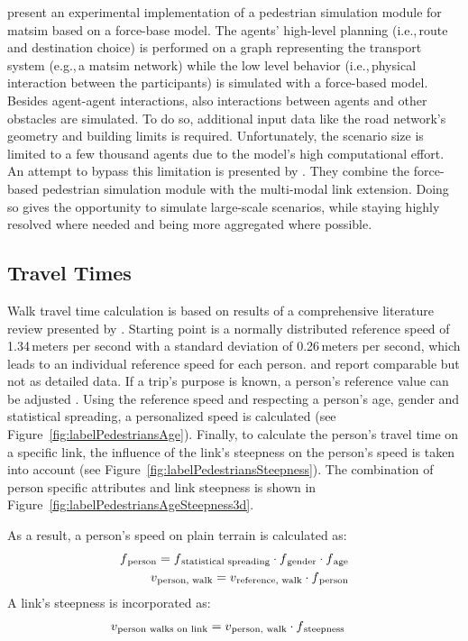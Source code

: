 \citet{LaemmelPlaue_PED_2012} present an experimental implementation of a pedestrian simulation module for \gls{matsim} based on a force-base model. The agents' high-level planning (i.e.,\,route and destination choice) is performed on a graph representing the transport system (e.g.,\,a \gls{matsim} network) while the low level behavior (i.e.,\,physical interaction between the participants) is simulated with a force-based model. Besides agent-agent interactions, also interactions between agents and other obstacles are simulated. To do so, additional input data like the road network's geometry and building limits is required. Unfortunately, the scenario size is limited to a few thousand agents due to the model's high computational effort. An attempt to bypass this limitation is presented by \citet{DoblerLaemmel_PED_2012}. They combine the force-based pedestrian simulation module with the multi-modal link extension. Doing so gives the opportunity to simulate large-scale scenarios, while staying highly resolved where needed and being more aggregated where possible.

\subsection{Travel Times} \label{sec:TravelTimes}
Walk travel time calculation is based on results of a comprehensive literature review presented by \citet{Weidmann_TechRep_IVT_1992}. Starting point is a normally distributed reference speed of 1.34\,meters per second with a standard deviation of 0.26\,meters per second, which leads to an individual reference speed for each person. \citet{HBS_2009} and \citet{HCM_2010} report comparable but not as detailed data. If a trip's purpose is known, a person's reference value can be adjusted \citep[commuting 1.49\,meters per second, shopping 1.16\,meters per second, leisure 1.10\,meters per second; see][]{HBS_2009}. Using the reference speed and respecting a person's age, gender and statistical spreading, a personalized speed is calculated (see Figure~\ref{fig:labelPedestriansAge}). Finally, to calculate the person's travel time on a specific link, the influence of the link's steepness on the person's speed is taken into account (see Figure~\ref{fig:labelPedestriansSteepness}). The combination of person specific attributes and link steepness is shown in Figure~\ref{fig:labelPedestriansAgeSteepness3d}.

As a result, a person's speed on plain terrain is calculated as:\begin{align}
	f\textsubscript{person} = f\textsubscript{statistical~spreading} \cdot f\textsubscript{gender} \cdot f\textsubscript{age}\\
	v\textsubscript{person, walk} = v\textsubscript{reference, walk} \cdot f\textsubscript{person}
\end{align}
A link's steepness is incorporated as:
\begin{align}
    v\textsubscript{person~walks~on~link} &= v\textsubscript{person, walk} \cdot f\textsubscript{steepness}
\end{align}

